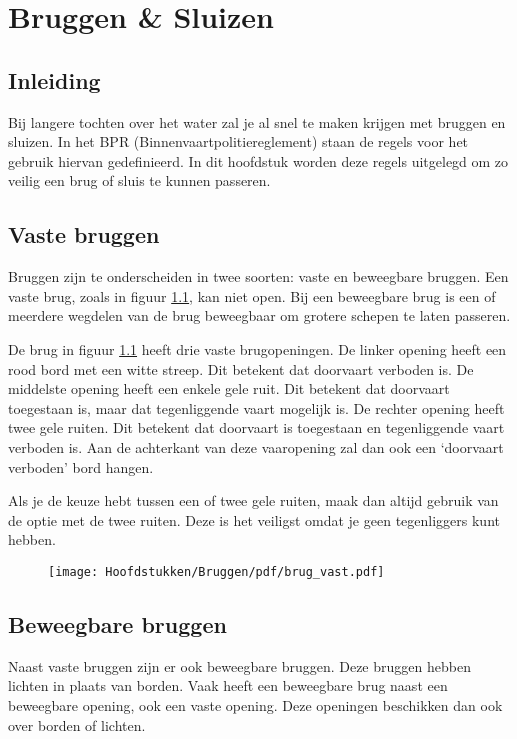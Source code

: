 \chapter{Bruggen \& Sluizen}
\section{Inleiding}
Bij langere tochten over het water zal je al snel te maken krijgen met bruggen en sluizen. In het BPR (Binnenvaartpolitiereglement) staan de regels voor het gebruik hiervan gedefinieerd. In dit hoofdstuk worden deze regels uitgelegd om zo veilig een brug of sluis te kunnen passeren.

\section{Vaste bruggen}
Bruggen zijn te onderscheiden in twee soorten: vaste en beweegbare bruggen. Een vaste brug, zoals in figuur \ref{pic:brug:vast}, kan niet open. Bij een beweegbare brug is een of meerdere wegdelen van de brug beweegbaar om grotere schepen te laten passeren. 

De brug in figuur \ref{pic:brug:vast} heeft drie vaste brugopeningen. De linker opening heeft een rood bord met een witte streep. Dit betekent dat doorvaart verboden is. De middelste opening heeft een enkele gele ruit. Dit betekent dat doorvaart toegestaan is, maar dat tegenliggende vaart mogelijk is. De rechter opening heeft twee gele ruiten. Dit betekent dat doorvaart is toegestaan en tegenliggende vaart verboden is. Aan de achterkant van deze vaaropening zal dan ook een `doorvaart verboden' bord hangen. 

Als je de keuze hebt tussen een of twee gele ruiten, maak dan altijd gebruik van de optie met de twee ruiten. Deze is het veiligst omdat je geen tegenliggers kunt hebben.
\begin{figure}[ht!]
  \centering
    \texttt{[image: Hoofdstukken/Bruggen/pdf/brug\_vast.pdf]}
    \caption{}
    \label{pic:brug:vast}
\end{figure}

\section{Beweegbare bruggen}
Naast vaste bruggen zijn er ook beweegbare bruggen. Deze bruggen hebben lichten in plaats van borden. Vaak heeft een beweegbare brug naast een beweegbare opening, ook een vaste opening. Deze openingen beschikken dan ook over borden of lichten.  

